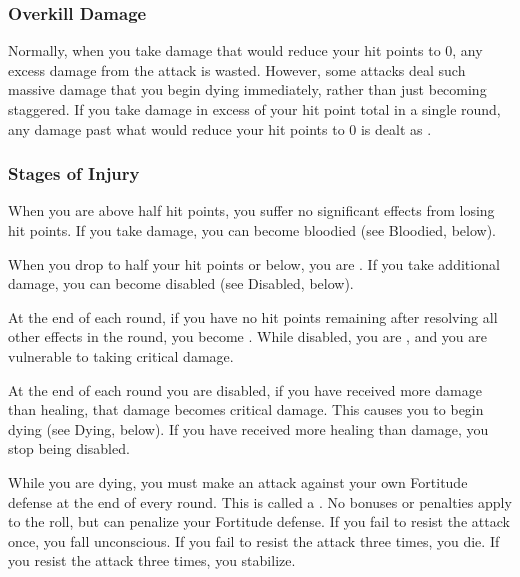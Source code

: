         \subsubsection{Overkill Damage}\label{Overkill Damage}
            Normally, when you take damage that would reduce your hit points to 0, any excess damage from the attack is wasted.
            However, some attacks deal such massive damage that you begin dying immediately, rather than just becoming staggered.
            If you take damage in excess of your  hit point total in a single round, any damage past what would reduce your hit points to 0 is dealt as .

        \subsubsection{Stages of Injury}

             When you are above half hit points, you suffer no significant effects from losing hit points.
            If you take damage, you can become bloodied (see Bloodied, below).

             When you drop to half your hit points or below, you are \bloodied.
            If you take additional damage, you can become disabled (see Disabled, below).

            \label{Disabled} At the end of each round, if you have no hit points remaining after resolving all other effects in the round, you become \disabled.
            While disabled, you are \staggered, and you are vulnerable to taking critical damage.

            At the end of each round you are disabled, if you have received more damage than healing, that damage becomes critical damage.
            This causes you to begin dying (see Dying, below).
            If you have received more healing than damage, you stop being disabled.

            \label{Dying} While you are dying, you must make an attack against your own Fortitude defense at the end of every round.
            This is called a .
            No bonuses or penalties apply to the roll, but  can penalize your Fortitude defense.
            If you fail to resist the attack once, you fall unconscious.
            If you fail to resist the attack three times, you die.
            If you resist the attack three times, you stabilize.

